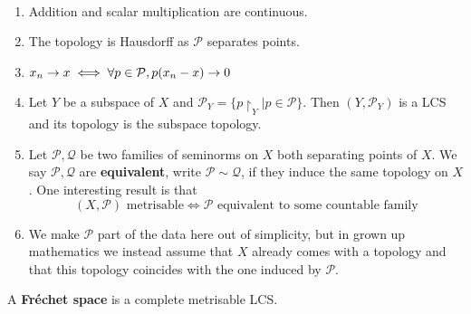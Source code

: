 \documentclass{article}
\begin{document}
\begin{rmks}~

  \begin{enumerate}
    \item Addition and scalar multiplication are continuous.
    \item The topology is Hausdorff as $\mathcal P$ separates points.
    \item $x_n \rightarrow x \iff \forall p \in \mathcal P, p(x_n - x) \rightarrow 0$
    \item Let $Y$ be a subspace of $X$ and $\mathcal P_Y = \{p\restriction_Y | p \in \mathcal P\}$. Then $(Y, \mathcal P_Y)$ is a LCS and its topology is the subspace topology.
    \item Let $\mathcal P, \mathcal Q$ be two families of seminorms on $X$ both separating points of $X$. We say $\mathcal P, \mathcal Q$ are {\bf equivalent}, write $\mathcal P \sim \mathcal Q$, if they induce the same topology on $X$. One interesting result is that
    $$ (X, \mathcal P) \text{ metrisable} \iff \mathcal P \text{ equivalent to some countable family}$$
    \item We make $\mathcal P$ part of the data here out of simplicity, but in grown up mathematics we instead assume that $X$ already comes with a topology and that this topology coincides with the one induced by $\mathcal P$.
  \end{enumerate}
\end{rmks}

\begin{defi}
  A {\bf Fréchet space} is a complete metrisable LCS.
\end{defi}
\end{document}

